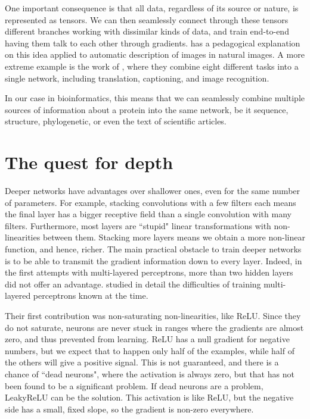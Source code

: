 One important consequence is that all data, regardless of its source or nature, is represented as tensors.
We can then seamlessly connect through these tensors different branches working with dissimilar kinds of data, and train end-to-end having them talk to each other through gradients.
\citet{tensors_and_gradients} has a pedagogical explanation on this idea applied to automatic description of images in natural images.
A more extreme example is the work of \citet{one_rule_all}, where they combine eight different tasks into a single network, including translation, captioning, and image recognition.

In our case in bioinformatics, this means that we can seamlessly combine multiple sources of information about a protein into the same network, be it sequence, structure, phylogenetic, or even the text of scientific articles.

\section{The quest for depth}\label{sec:depth}
Deeper networks have advantages over shallower ones, even for the same number of parameters.
For example, stacking convolutions with a few filters each means the final layer has a bigger receptive field than a single convolution with many filters.
Furthermore, most layers are ``stupid" linear transformations with non-linearities between them.
Stacking more layers means we obtain a more non-linear function, and hence, richer.
The main practical obstacle to train deeper networks is to be able to transmit the gradient information down to every layer.
Indeed, in the first attempts with multi-layered perceptrons, more than two hidden layers did not offer an advantage.
\citet{glorot} studied in detail the difficulties of training multi-layered perceptrons known at the time.

Their first contribution  was non-saturating non-linearities, like ReLU.
Since they do not saturate, neurons are never stuck in ranges where the gradients are almost zero, and thus prevented from learning.
ReLU has a null gradient for negative numbers, but we expect that to happen only half of the examples, while half of the others will give a positive signal.
This is not guaranteed, and there is a chance of ``dead neurons", where the activation is always zero, but that has not been found to be a significant problem.
If dead neurons are a problem, LeakyReLU  %
can be the solution.
This activation is like ReLU, but the negative side has a small, fixed slope, so the gradient is non-zero everywhere.


